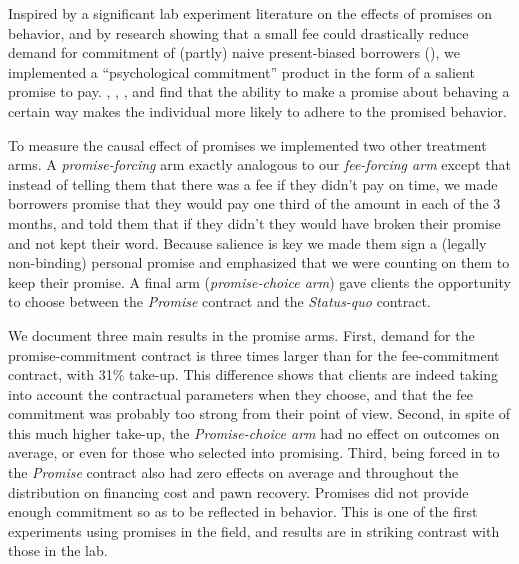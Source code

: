 \documentclass[oneside,11pt]{article}
\begin{document}
Inspired by a significant lab experiment literature on the effects of promises on behavior, and by research showing that a small fee could drastically reduce demand for commitment of (partly) naive present-biased borrowers (\cite{Laibson2015}), we implemented a ``psychological commitment'' product in the form of a salient promise to pay.  \cite{PromisesPartnerships}, \cite{FurtherPromises}, \cite{Vanberg}, and \cite{Ismayilov2017} find that the ability to make a promise about behaving a certain way makes the individual more likely to adhere to the promised behavior. %

To measure the causal effect of promises we implemented two other treatment arms. A \textit{promise-forcing} arm exactly analogous to our \textit{fee-forcing arm} except that instead of telling them that there was a fee if they didn't pay on time, we made borrowers promise that they would pay one third of the amount in each of the 3 months, and told them that if they didn't they would have broken their promise and not kept their word. Because salience is key we made them sign a (legally non-binding) personal promise and emphasized that we were counting on them to keep their promise. A final arm (\textit{promise-choice arm}) gave clients the opportunity to choose between the \textit{Promise} contract and the \textit{Status-quo} contract.

We document three main results in the promise arms. First, demand for the promise-commitment contract is three times larger than for the fee-commitment contract, with {31}\% take-up. This difference shows that clients are indeed taking into account the contractual parameters when they choose, and that the fee commitment was probably too strong from their point of view. Second, in spite of this much higher take-up, the \textit{Promise-choice arm} had no effect on outcomes on average, or even for those who selected into promising. Third, being forced in to the \textit{Promise} contract also had zero effects on average and throughout the distribution on financing cost and pawn recovery. %
Promises did not provide enough commitment so as to be reflected in behavior. This is one of the first  experiments using promises in the field, and results are in striking contrast with those in the lab.
\end{document}
